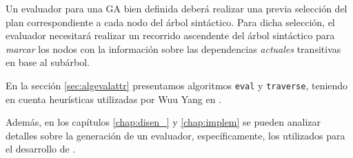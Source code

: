 Un evaluador para una GA bien definida deberá realizar una previa selección del plan correspondiente a cada nodo del árbol sintáctico. Para dicha selección, el evaluador necesitará realizar un recorrido ascendente del árbol sintáctico para \emph{marcar} los nodos con la información sobre las dependencias \emph{actuales} transitivas en base al subárbol.

En la sección \ref{sec:algevalattr} presentamos algoritmos \texttt{eval} y \texttt{traverse}, teniendo en cuenta heurísticas utilizadas por Wuu Yang en \cite{wuu-yang1}.

Además, en los capítulos \ref{chap:disen_} y \ref{chap:implem} se pueden analizar detalles sobre la generación de un evaluador, específicamente, los utilizados para el desarrollo de \maggen.
